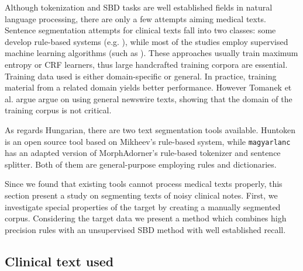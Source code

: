 Although tokenization and SBD tasks are well established fields in natural language processing, there are only a few attempts aiming medical texts. 
Sentence segmentation attempts for clinical texts fall into two classes: some develop rule-based systems (e.g. \cite{XuSDJWD10}), while most of the studies employ supervised machine learning algorithms (such as \cite{apostolova2009automatic,cho2002text,Savova2010,taira2001automatic,tomanek2007sentence}).
These approaches usually train maximum entropy or CRF learners, thus large handcrafted training corpora are essential. Training data used is either domain-specific or general. 
In practice, training material from a related domain yields better performance. However Tomanek et al. argue \cite{tomanek2006reappraisal} argue on using general newswire texts,
showing that the domain of the training corpus is not critical.

As regards Hungarian, there are two text segmentation tools available. Huntoken \cite{halacsy2004creating} is an open source tool based on Mikheev’s rule-based system, while \texttt{magyarlanc} \cite{zsibrata2013magyarlanc} has an adapted version of MorphAdorner’s rule-based tokenizer \cite{kumar2009monk} and sentence splitter. Both of them are general-purpose employing rules and dictionaries.


Since we found that existing tools cannot process medical texts properly, this section present a study on segmenting texts of noisy clinical notes. First, we investigate special properties of the target by creating a manually segmented corpus. Considering the target data we present a method which combines high precision rules with an unsupervised SBD method with well established recall.

\subsection{Clinical text used}

